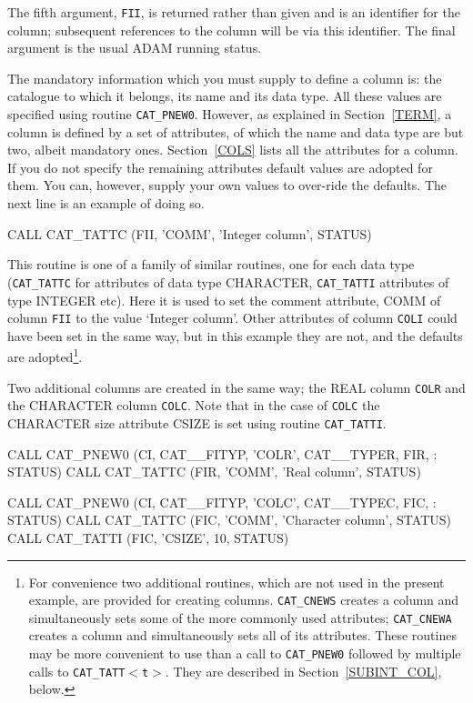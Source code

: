 \documentclass[11pt,twoside]{starlink}
\begin{document}
The fifth argument, \texttt{FII}, is returned rather than given and is an
identifier for the column; subsequent references to the column will be
via this identifier. The final argument is the usual ADAM running
status.

The mandatory information which you must supply to define a column is:
the catalogue to which it belongs, its name and its data type. All these
values are specified using routine \texttt{CAT\_PNEW0}. However, as
explained in Section~\ref{TERM}, a column is defined by a set of
attributes, of which the name and data type are but two, albeit
mandatory ones. Section~\ref{COLS} lists all the attributes for a
column. If you do not specify the remaining attributes default
values are adopted for them. You can, however, supply your own values to
over-ride the defaults. The next line is an example of doing so.

\begin{terminalv}
         CALL CAT_TATTC (FII, 'COMM', 'Integer column', STATUS)
\end{terminalv}

This routine is one of a family of similar routines, one for each
data type (\texttt{CAT\_TATTC} for attributes of data type CHARACTER,
\texttt{CAT\_TATTI} attributes of type INTEGER etc). Here it is used
to set the comment attribute, COMM of column \texttt{FII} to the
value `Integer column'. Other attributes of column \texttt{COLI} could have
been set in the same way, but in this example they are not, and the
defaults are adopted\footnote{For convenience two additional routines,
which are not used in the present example, are provided for creating
columns. \texttt{CAT\_CNEWS} creates a column and simultaneously sets some
of the more commonly used attributes; \texttt{CAT\_CNEWA} creates a column
and simultaneously sets all of its attributes. These routines may be
more convenient to use than a call to \texttt{CAT\_PNEW0} followed by
multiple calls to \texttt{CAT\_TATT$<$t$>$}. They are described in
Section~\ref{SUBINT_COL}, below.}.

Two additional columns are created in the same way; the REAL column
\texttt{COLR} and the CHARACTER column \texttt{COLC}. Note that in the case of
\texttt{COLC} the CHARACTER size attribute CSIZE is set using routine \texttt{CAT\_TATTI}.

\begin{terminalv}
         CALL CAT_PNEW0 (CI, CAT__FITYP, 'COLR', CAT__TYPER, FIR,
     :     STATUS)
         CALL CAT_TATTC (FIR, 'COMM', 'Real column', STATUS)

         CALL CAT_PNEW0 (CI, CAT__FITYP, 'COLC', CAT__TYPEC, FIC,
     :     STATUS)
         CALL CAT_TATTC (FIC, 'COMM', 'Character column', STATUS)
         CALL CAT_TATTI (FIC, 'CSIZE', 10, STATUS)
\end{terminalv}
\end{document}
